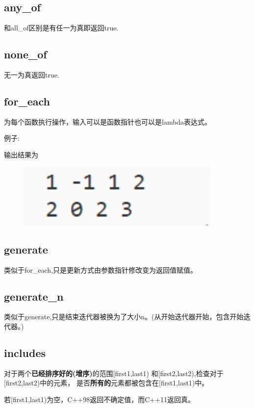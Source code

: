 \documentclass{article}
\begin{document}
    \subsection{any\_of}
    和all\_of区别是有任一为真即返回true.

    \subsection{none\_of}
    无一为真返回true.

    \subsection{for\_each}
    为每个函数执行操作，输入可以是函数指针也可以是lambda表达式。
    
    例子:
    

    输出结果为
    \begin{figure}[H]
        \centering
        \includegraphics[width = 0.9\textwidth]{fig9.png}
    \end{figure}

    \subsection{generate}
    类似于for\_each,只是更新方式由参数指针修改变为返回值赋值。
    
    \subsection{generate\_n}
    类似于generate,只是结束迭代器被换为了大小n。(从开始迭代器开始，包含开始迭代器。)

    \subsection{includes}
    对于两个\textbf{已经排序好的(增序)}的范围[first1,last1) 和[first2,last2),检查对于[first2,last2)中的元素，
    是否\textbf{所有的}元素都被包含在[first1,last1)中。

    若[first1,last1)为空，C++98返回不确定值，而C++11返回真。
\end{document}
